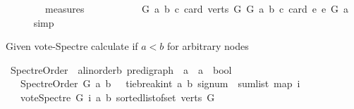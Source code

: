 \begin{isabellebody}
\ \ \ \ \ \ \ {\isasymin}\ measures\isanewline
\ \ \ \ \ \ \ \ \ \ \ {\isacharbrackleft}{\kern0pt}{\isasymlambda}{\isacharparenleft}{\kern0pt}G{\isacharcomma}{\kern0pt}\ a{\isacharcomma}{\kern0pt}\ b{\isacharcomma}{\kern0pt}\ c{\isacharparenright}{\kern0pt}{\isachardot}{\kern0pt}\ card\ {\isacharparenleft}{\kern0pt}verts\ G{\isacharparenright}{\kern0pt}{\isacharcomma}{\kern0pt}\ {\isasymlambda}{\isacharparenleft}{\kern0pt}G{\isacharcomma}{\kern0pt}\ a{\isacharcomma}{\kern0pt}\ b{\isacharcomma}{\kern0pt}\ c{\isacharparenright}{\kern0pt}{\isachardot}{\kern0pt}\ card\ {\isacharbraceleft}{\kern0pt}e{\isachardot}{\kern0pt}\ e\ {\isasymrightarrow}\isactrlsup {\isacharasterisk}{\kern0pt}\isactrlbsub G\isactrlesub \ a{\isacharbraceright}{\kern0pt}{\isacharbrackright}{\kern0pt}{\isachardoublequoteclose}\isanewline
\ \ \ \ \isamarkupfalse%
\ simp\isanewline
{}\isamarkupfalse%
%
\endisatagproof
{\isafoldproof}%
%
\isadelimproof
%
\endisadelimproof
%
\begin{isamarkuptext}%
Given vote-Spectre calculate if $a < b$ for arbitrary nodes%
\end{isamarkuptext}\isamarkuptrue%
\isamarkupfalse%
\ Spectre{\isacharunderscore}{\kern0pt}Order\ {\isacharcolon}{\kern0pt}{\isacharcolon}{\kern0pt}\ {\isachardoublequoteopen}{\isacharparenleft}{\kern0pt}{\isacharprime}{\kern0pt}a{\isacharcolon}{\kern0pt}{\isacharcolon}{\kern0pt}linorder{\isacharcomma}{\kern0pt}{\isacharprime}{\kern0pt}b{\isacharparenright}{\kern0pt}\ pre{\isacharunderscore}{\kern0pt}digraph\ {\isasymRightarrow}\ {\isacharprime}{\kern0pt}a\ {\isasymRightarrow}\ {\isacharprime}{\kern0pt}a\ {\isasymRightarrow}\ bool{\isachardoublequoteclose}\isanewline
\ \ \ {\isachardoublequoteopen}Spectre{\isacharunderscore}{\kern0pt}Order\ G\ a\ b\ {\isacharequal}{\kern0pt}\ {\isacharparenleft}{\kern0pt}\ tie{\isacharunderscore}{\kern0pt}break{\isacharunderscore}{\kern0pt}int\ a\ b\ {\isacharparenleft}{\kern0pt}signum\ {\isacharparenleft}{\kern0pt}\ sum{\isacharunderscore}{\kern0pt}list\ {\isacharparenleft}{\kern0pt}map\ {\isacharparenleft}{\kern0pt}{\isasymlambda}i{\isachardot}{\kern0pt}\isanewline
\ \ \ {\isacharparenleft}{\kern0pt}vote{\isacharunderscore}{\kern0pt}Spectre\ G\ i\ a\ b{\isacharparenright}{\kern0pt}{\isacharparenright}{\kern0pt}\ {\isacharparenleft}{\kern0pt}sorted{\isacharunderscore}{\kern0pt}list{\isacharunderscore}{\kern0pt}of{\isacharunderscore}{\kern0pt}set\ {\isacharparenleft}{\kern0pt}verts\ G{\isacharparenright}{\kern0pt}{\isacharparenright}{\kern0pt}{\isacharparenright}{\kern0pt}{\isacharparenright}{\kern0pt}{\isacharparenright}{\kern0pt}\ {\isacharequal}{\kern0pt}\ {}{\isacharparenright}{\kern0pt}{\isachardoublequoteclose}%

\end{isabellebody}
